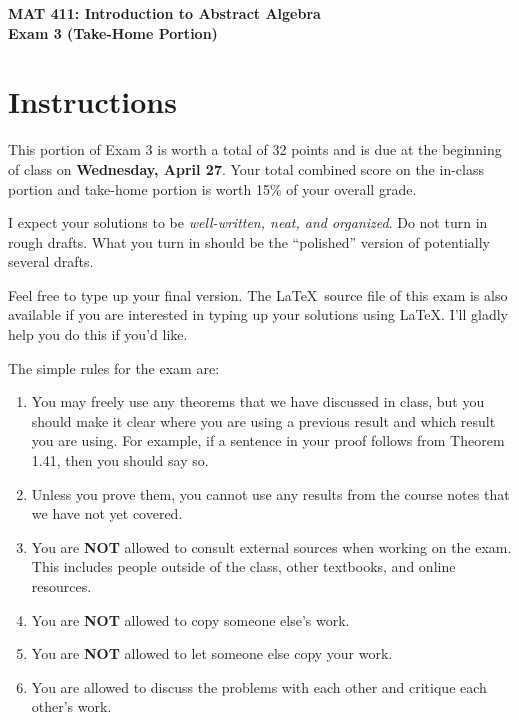 \documentclass[11pt]{article}
\theoremstyle{definition}
\begin{document}
\begin{center}

{\Large\bf MAT 411: Introduction to Abstract Algebra}\\
\smallskip
{\Large\bf Exam 3 (Take-Home Portion)}

\bigskip

  
  \bigskip
  

\end{center}

\section*{Instructions}

This portion of Exam 3 is worth a total of 32 points and is due at the beginning of class on \textbf{Wednesday, April 27}.  Your total combined score on the in-class portion and take-home portion is worth 15\% of your overall grade.  

\bigskip

I expect your solutions to be \emph{well-written, neat, and organized}.  Do not turn in rough drafts.  What you turn in should be the ``polished'' version of potentially several drafts.  
 
\bigskip

Feel free to type up your final version.  The \LaTeX\ source file of this exam is also available if you are interested in typing up your solutions using \LaTeX.  I'll gladly help you do this if you'd like.

\bigskip

The simple rules for the exam are:

\begin{enumerate}
\item You may freely use any theorems that we have discussed in class, but you should make it clear where you are using a previous result and which result you are using.  For example, if a sentence in your proof follows from Theorem 1.41, then you should say so.
\item Unless you prove them, you cannot use any results from the course notes that we have not yet covered.
\item You are \textbf{NOT} allowed to consult external sources when working on the exam.  This includes people outside of the class, other textbooks, and online resources.
\item You are \textbf{NOT} allowed to copy someone else's work.
\item You are \textbf{NOT} allowed to let someone else copy your work.
\item You are allowed to discuss the problems with each other and critique each other's work.
\end{enumerate}
\end{document}
